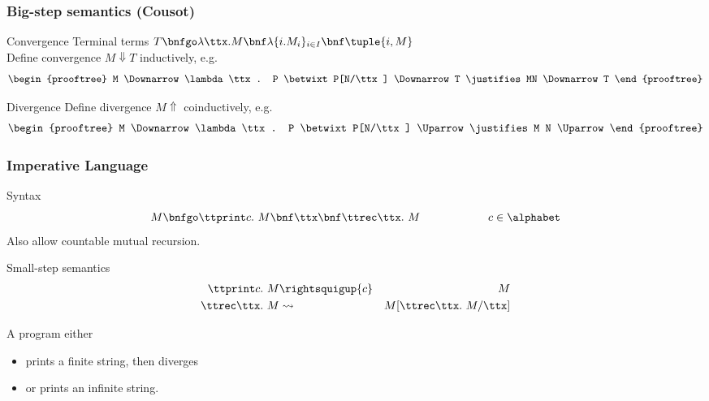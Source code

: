 \documentclass{beamer}
\begin{document}
\begin{frame}\frametitle{Big-step semantics (Cousot)}

  \begin{block}{Convergence}
    Terminal terms $T \bnfgo \lambda \ttx. M \bnf \lambda\{i.M_{i}\}_{i \in I} \bnf \tuple{i,M} $ \\
    \medskip Define convergence $M \Downarrow T$ inductively, e.g.
\begin{displaymath}
  \begin{prooftree}
    M \Downarrow \lambda \ttx. P \betwixt P[N/\ttx] \Downarrow T \justifies MN
    \Downarrow T
  \end{prooftree}
\end{displaymath}
\end{block}
\pause
\begin{block}{Divergence}
  Define divergence $M \Uparrow$ coinductively, e.g.
\begin{displaymath}
  \begin{prooftree}
    M \Downarrow \lambda \ttx. P \betwixt P[N/\ttx] \Uparrow \justifies M N
    \Uparrow
  \end{prooftree}
\end{displaymath}
\end{block}
  
\end{frame}

\begin{frame}\frametitle{Imperative Language}
  
  \begin{block}{Syntax}
 \begin{displaymath}
    M \bnfgo \ttprint c.\ M \bnf \ttx \bnf \ttrec \ttx.\ M \hspace{6em} c \in \alphabet
  \end{displaymath}
  Also allow countable mutual recursion.
\end{block}

\pause

\begin{block}{Small-step semantics}
\begin{eqnarray*}
  \ttprint c.\ M & \rightsquigup{c} & M \\
  \ttrec \ttx.\ M & \rightsquigarrow & M[\ttrec \ttx.\ M/\ttx]
\end{eqnarray*}
\end{block}
\pause

A program either 
\begin{itemize}
\item prints a finite string, then diverges
\item or prints an infinite string.
\end{itemize}


\end{frame}
\end{document}
